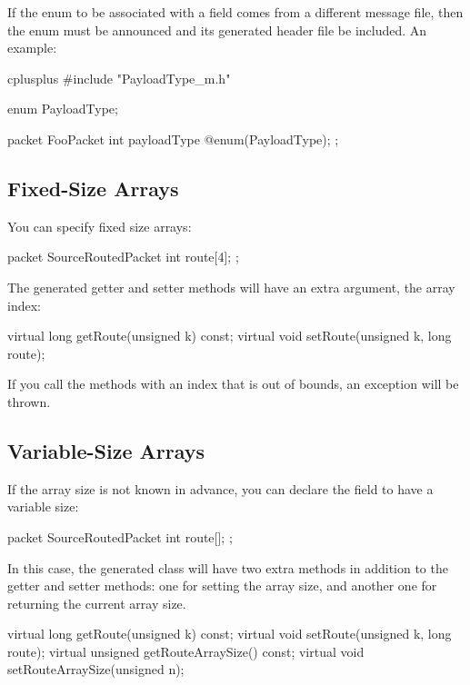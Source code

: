 If the enum to be associated with a field comes from a different message file,
then the enum must be announced and its generated header file be included.
An example:

\begin{msg}
cplusplus {{
#include "PayloadType_m.h"
}}

enum PayloadType;

packet FooPacket
{
    int payloadType @enum(PayloadType);
};
\end{msg}



\subsection{Fixed-Size Arrays}
\label{sec:ch-msg-defs:fixed-size-arrays}

You can specify fixed size arrays:

\begin{msg}
packet SourceRoutedPacket
{
    int route[4];
};
\end{msg}

The generated getter and setter methods will have an extra  argument,
the array index:

\begin{cpp}
virtual long getRoute(unsigned k) const;
virtual void setRoute(unsigned k, long route);
\end{cpp}

If you call the methods with an index that is out of bounds, an exception
will be thrown.


\subsection{Variable-Size Arrays}
\label{sec:ch-msg-defs:variable-size-arrays}

If the array size is not known in advance, you can declare the field
to have a variable size:

\begin{msg}
packet SourceRoutedPacket
{
    int route[];
};
\end{msg}

In this case, the generated class will have two extra methods in addition
to the getter and setter methods: one for setting the array size, and another
one for returning the current array size.

\begin{cpp}
virtual long getRoute(unsigned k) const;
virtual void setRoute(unsigned k, long route);
virtual unsigned getRouteArraySize() const;
virtual void setRouteArraySize(unsigned n);
\end{cpp}

